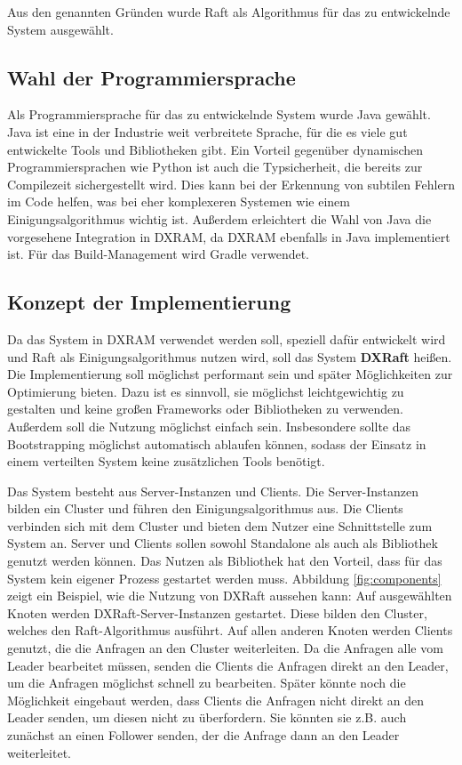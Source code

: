 Aus den genannten Gründen wurde Raft als Algorithmus für das zu entwickelnde System ausgewählt.

\subsection{Wahl der Programmiersprache}
 \label{sprache}

Als Programmiersprache für das zu entwickelnde System wurde Java gewählt. Java ist eine in der Industrie weit verbreitete Sprache, für die es viele gut entwickelte Tools und Bibliotheken gibt. Ein Vorteil gegenüber dynamischen Programmiersprachen wie Python ist auch die Typsicherheit, die bereits zur Compilezeit sichergestellt wird. Dies kann bei der Erkennung von subtilen Fehlern im Code helfen, was bei eher komplexeren Systemen wie einem Einigungsalgorithmus wichtig ist. Außerdem erleichtert die Wahl von Java die vorgesehene Integration in DXRAM, da DXRAM ebenfalls in Java implementiert ist. Für das Build-Management wird Gradle verwendet.

\subsection{Konzept der Implementierung}
 \label{konzept}

Da das System in DXRAM verwendet werden soll, speziell dafür entwickelt wird und Raft als Einigungsalgorithmus nutzen wird, soll das System \textbf{DXRaft} heißen. Die Implementierung soll möglichst performant sein und später Möglichkeiten zur Optimierung bieten. Dazu ist es sinnvoll, sie möglichst leichtgewichtig zu gestalten und keine großen Frameworks oder Bibliotheken zu verwenden. Außerdem soll die Nutzung möglichst einfach sein. Insbesondere sollte das Bootstrapping möglichst automatisch ablaufen können, sodass der Einsatz in einem verteilten System keine zusätzlichen Tools benötigt.

Das System besteht aus Server-Instanzen und Clients. Die Server-Instanzen bilden ein Cluster und führen den Einigungsalgorithmus aus. Die Clients verbinden sich mit dem Cluster und bieten dem Nutzer eine Schnittstelle zum System an. Server und Clients sollen sowohl Standalone als auch als Bibliothek genutzt werden können. Das Nutzen als Bibliothek hat den Vorteil, dass für das System kein eigener Prozess gestartet werden muss. Abbildung \ref{fig:components} zeigt ein Beispiel, wie die Nutzung von DXRaft aussehen kann: Auf ausgewählten Knoten werden DXRaft-Server-Instanzen gestartet. Diese bilden den Cluster, welches den Raft-Algorithmus ausführt. Auf allen anderen Knoten werden Clients genutzt, die die Anfragen an den Cluster weiterleiten. Da die Anfragen alle vom Leader bearbeitet müssen, senden die Clients die Anfragen direkt an den Leader, um die Anfragen möglichst schnell zu bearbeiten. Später könnte noch die Möglichkeit eingebaut werden, dass Clients die Anfragen nicht direkt an den Leader senden, um diesen nicht zu überfordern. Sie könnten sie z.B. auch zunächst an einen Follower senden, der die Anfrage dann an den Leader weiterleitet.

